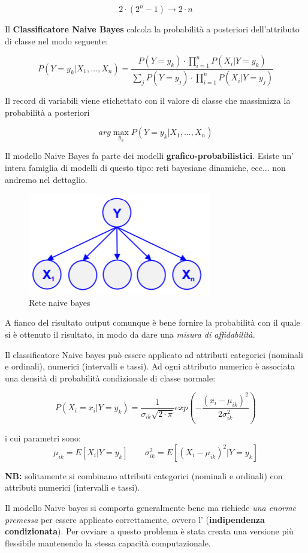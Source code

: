 \[2 \cdot (2^n-1) \rightarrow 2 \cdot n\]

Il \textbf{Classificatore Naive Bayes} calcola la probabilità a posteriori dell'attributo di classe nel modo seguente:

\[P(Y=y_k|X_1,...,X_n) = \frac{P(Y=y_k)\cdot \prod_{i=1}^{n}P(X_i|Y=y_k)}{\sum_{j}P(Y=y_j) \cdot \prod_{i=1}^{n}P(X_i|Y=y_j)} \]

Il record di variabili viene etichettato con il valore di classe che massimizza la probabilità a posteriori

\[arg\max_{y_k} P(Y = y_k | X_1,...,X_n)\]

Il modello Naive Bayes fa parte dei modelli \textbf{grafico-probabilistici}. Esiste un' intera famiglia di modelli di questo tipo: reti bayesiane dinamiche, ecc... non andremo nel dettaglio.

\begin{figure}[h!]
	\centering
	\includegraphics[height=0.3 \linewidth]{classification/pict/naivebayes.png}
	\caption{Rete naive bayes}
\end{figure}

A fianco del risultato output comunque è bene fornire la probabilità con il quale si è ottenuto il risultato, in modo da dare una \textit{misura di affidabilità.} 

Il classificatore Naive bayes può essere applicato ad attributi categorici (nominali e ordinali), numerici (intervalli e tassi). Ad ogni attributo numerico è associata una densità di probabilità condizionale di classe normale:

\[P(X_i = x_i | Y = y_k) = \frac{1}{\sigma_{ik}\sqrt{2 \cdot \pi}}exp(-\frac{(x_i-\mu_{ik})^2}{2 \sigma_{ik}^2})\] 

i cui parametri sono: 
\[\mu_{ik} = E[X_i | Y = y_k] \qquad \sigma_{ik}^2 = E[(X_i - \mu_{ik})^2 | Y = y_k]\]

\textbf{NB:} solitamente si combinano attributi categorici (nominali e ordinali) con attributi numerici (intervalli e tassi).

Il modello Naive bayes si comporta generalmente bene ma richiede \textit{una enorme premessa} per essere applicato correttamente, ovvero l' (\textbf{indipendenza condizionata}). Per ovviare a questo problema è stata creata una versione più flessibile mantenendo la stessa capacità computazionale.

